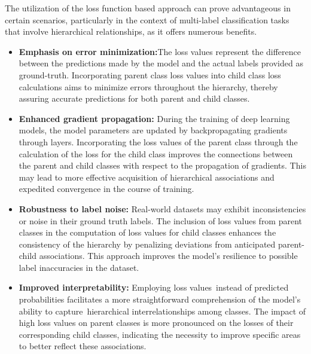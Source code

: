 The utilization of the loss function based approach can prove advantageous in certain scenarios, particularly in the context of multi-label classification tasks that involve hierarchical relationships, as it offers numerous benefits.
\begin{itemize}
    \item \textbf{Emphasis on error minimization:}The loss values represent the difference between the predictions made by the model and the actual labels provided as ground-truth. Incorporating parent class loss values into child class loss calculations aims to minimize errors throughout the hierarchy, thereby assuring accurate predictions for both parent and child classes.
    \item \textbf{Enhanced gradient propagation:} During the training of deep learning models, the model parameters are updated by backpropagating gradients through layers. Incorporating the loss values of the parent class through the calculation of the loss for the child class improves the connections between the parent and child classes with respect to the propagation of gradients. This may lead to more effective acquisition of hierarchical associations and expedited convergence in the course of training.
    \item \textbf{Robustness to label noise:} Real-world datasets may exhibit inconsistencies or noise in their ground truth labels. The inclusion of loss values from parent classes in the computation of loss values for child classes enhances the consistency of the hierarchy by penalizing deviations from anticipated parent-child associations. This approach improves the model's resilience to possible label inaccuracies in the dataset.
    \item \textbf{Improved interpretability:} Employing loss values instead of predicted probabilities facilitates a more straightforward comprehension of the model's ability to capture hierarchical interrelationships among classes. The impact of high loss values on parent classes is more pronounced on the losses of their corresponding child classes, indicating the necessity to improve specific areas to better reflect these associations.
\end{itemize}

